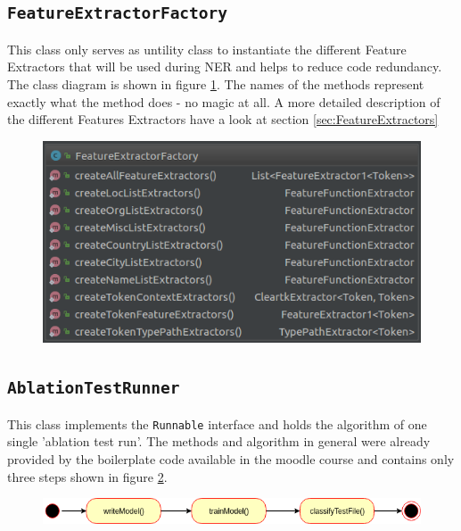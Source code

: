 \documentclass[11pt, english]{article}
\begin{document}
\subsection{\texttt{FeatureExtractorFactory}}
\label{sec:FeatureExtractorFactory}
This class only serves as untility class to instantiate the different Feature Extractors that will be used during NER and helps to reduce code redundancy. The class diagram is shown in figure \ref{fig:FeatureExtractorFactory}. The names of the methods represent exactly what the method does - no magic at all. A more detailed description of the different Features Extractors have a look at section \ref{sec:FeatureExtractors}

\begin{figure}
    \centering
    \includegraphics[scale=0.5]{gfx/FeatureExtractorFactory.png}
    \label{fig:FeatureExtractorFactory}
\end{figure}

\subsection{\texttt{AblationTestRunner}}
\label{sec:AblationTestRunner}
This class implements the \verb/Runnable/ interface and holds the algorithm of one single 'ablation test run'. The methods and algorithm in general were already provided by the boilerplate code available in the moodle course and contains only three steps shown in figure \ref{fig:AblationTestRunnerAlgo}. 

\begin{figure}
    \centering
    \includegraphics[scale=0.5]{gfx/ablationRunnerAlgo.png}
    \label{fig:AblationTestRunnerAlgo}
\end{figure}
\end{document}
